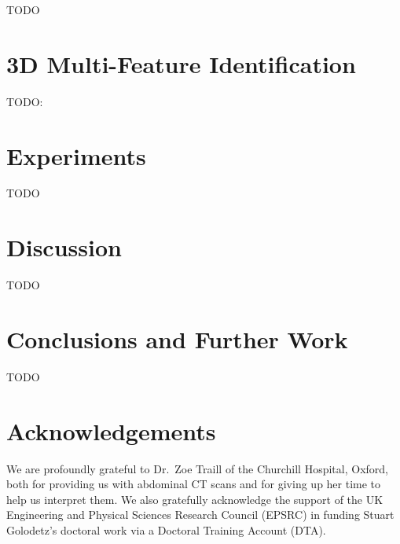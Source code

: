 \documentclass[10pt,twocolumn,twoside]{IEEEtran}
\begin{document}
TODO

\section{3D Multi-Feature Identification}
\label{sec:multi3d}

TODO: \cite{golodetz11}

\section{Experiments}
\label{sec:experiments}

TODO

\section{Discussion}
\label{sec:discussion}

TODO

\section{Conclusions and Further Work}
\label{sec:conclusions}

TODO

\section{Acknowledgements}

We are profoundly grateful to Dr.\ Zoe Traill of the Churchill Hospital, Oxford, both for providing us with abdominal CT scans and for giving up her time to help us interpret them. We also gratefully acknowledge the support of the UK Engineering and Physical Sciences Research Council (EPSRC) in funding Stuart Golodetz's doctoral work via a Doctoral Training Account (DTA).

\clearpage




\vspace{1cm}
\end{document}
